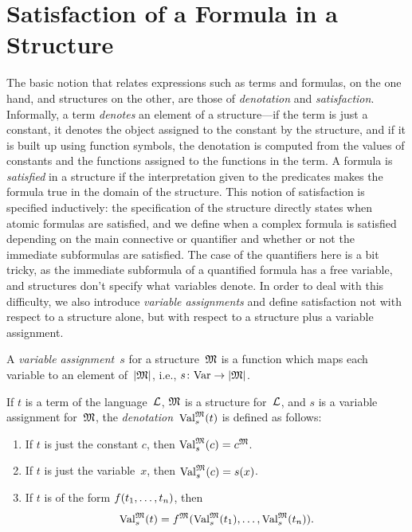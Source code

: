 \documentclass[open-logic-section]{subfiles}
\begin{document}
\section{Satisfaction of a Formula in a Structure}

\begin{wordy}
The basic notion that relates expressions such as terms and formulas,
on the one hand, and structures on the other, are those of
\emph{denotation} and \emph{satisfaction}.  Informally, a term
\emph{denotes} an element of a structure---if the term is just a
constant, it denotes the object assigned to the constant by the
structure, and if it is built up using function symbols, the
denotation is computed from the values of constants and the functions
assigned to the functions in the term.  A formula is \emph{satisfied}
in a structure if the interpretation given to the predicates makes the
formula true in the domain of the structure. This notion of
satisfaction is specified inductively: the specification of the
structure directly states when atomic formulas are satisfied, and we
define when a complex formula is satisfied depending on the main
connective or quantifier and whether or not the immediate subformulas
are satisfied. The case of the quantifiers here is a bit tricky, as
the immediate subformula of a quantified formula has a free variable,
and structures don't specify what variables denote.  In order to deal
with this difficulty, we also introduce \emph{variable assignments}
and define satisfaction not with respect to a structure alone, but
with respect to a structure plus a variable assignment.
\end{wordy}

\begin{defn}
A \emph{variable assignment}~$s$ for a structure~$\mathfrak{M}$ is a
function which maps each variable to an element of~$\left| \mathfrak M \right|$, i.e.,
$s\colon \mathrm{Var} \to \left| \mathfrak M \right|$.
\end{defn}

\begin{defn}
If $t$ is a term of the language~$\mathcal L$, $\mathfrak M$ is a structure
for~$\mathcal L$, and $s$ is a variable assignment for~$\mathfrak M$, the
\emph{denotation}~$\Value{t}{M}[s]$ is defined as follows:
\begin{enumerate}
\item If $t$ is just the constant $c$, then $\Value{c}{M}[s] = \Assign{c}{M}$.
\item If $t$ is just the variable~$x$, then $\Value{c}{M}[s] = s(x)$.
\item If $t$ is of the form ${ f(t_1, \ldots, t_n) }$, then
\[
\Value{t}{M}[s] = \Assign{f}{M}(\Value{t_1}{M}[s], \ldots,
\Value{t_n}{M}[s]).
\]
\end{enumerate}
\end{defn}
\end{document}
